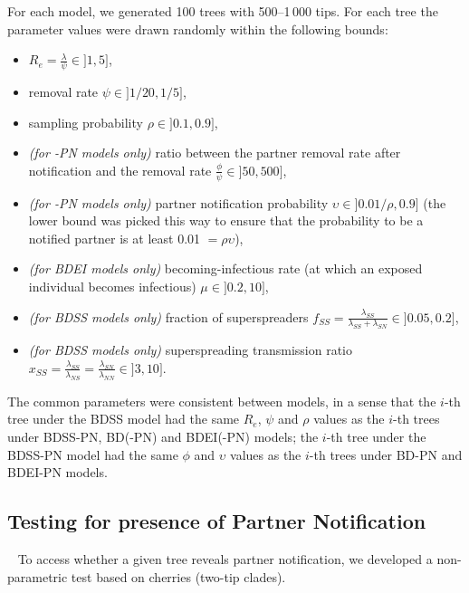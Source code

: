 \documentclass[10pt,letterpaper]{article}
\begin{document}
For each model, we generated 100 trees with 500--1\,000 tips. For each tree the parameter values were drawn randomly within the following bounds:
\begin{itemize}
\item $R_e = \frac{{\lambda}}{{\psi}} \in ]1, 5]$, 
\item removal rate $\psi \in ]1 / 20, 1 / 5]$,
\item sampling probability $\rho \in ]0.1, 0.9]$,
\item \textit{(for -PN models only)} ratio between the partner removal rate after notification and the removal rate $\frac{\phi}{\psi} \in ]50, 500]$,
\item \textit{(for -PN models only)} partner notification probability $\upsilon \in ]0.01/\rho, 0.9]$ (the lower bound was picked this way to ensure that the probability to be a notified partner is at least 0.01 $=\rho \upsilon$),
\item \textit{(for BDEI models only)} becoming-infectious rate (at which an exposed individual becomes infectious) $\mu \in ]0.2, 10]$,
\item \textit{(for BDSS models only)} fraction of superspreaders $f_{SS} = \frac{\lambda_{SS}}{\lambda_{SS} + \lambda_{SN}} \in ]0.05, 0.2]$,
\item \textit{(for BDSS models only)} superspreading transmission ratio $x_{SS} = \frac{\lambda_{SS}}{\lambda_{NS}} = \frac{\lambda_{SN}}{\lambda_{NN}} \in ]3, 10]$.
\end{itemize} 

The common parameters were consistent between models, in a sense that the $i$-th tree under the BDSS model had the same $R_e$, $\psi$ and $\rho$ values as the $i$-th trees under BDSS-PN, BD(-PN) and BDEI(-PN) models; the $i$-th tree under the BDSS-PN model had the same $\phi$ and $\upsilon$ values as the $i$-th trees under BD-PN and BDEI-PN models.



\subsection*{Testing for presence of Partner Notification}~\label{sec:test}
To access whether a given tree reveals partner notification, we developed a non-parametric test based on cherries (two-tip clades). 
\end{document}
